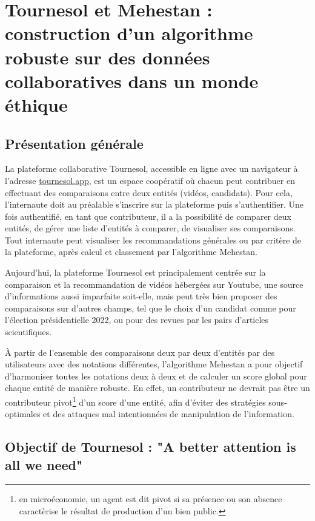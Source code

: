 \section{Tournesol et Mehestan : construction d'un algorithme robuste sur des données collaboratives dans un monde éthique}

\subsection{Présentation générale}

La plateforme collaborative Tournesol, accessible en ligne avec un navigateur à l'adresse
\href{https://tournesol.app}{tournesol.app}, est un espace coopératif où chacun peut contribuer en effectuant des comparaisons entre deux entités (vidéos, candidats). Pour cela, l'internaute doit au préalable s'inscrire sur la plateforme puis s'authentifier. Une fois authentifié, en tant que contributeur, il a la possibilité de comparer deux entités, de gérer une liste d'entités à comparer, de visualiser ses comparaisons. Tout internaute peut visualiser les recommandations générales ou par critère de la plateforme, après calcul et classement par l'algorithme Mehestan.

Aujourd'hui, la plateforme Tournesol est principalement centrée sur la comparaison et la recommandation de vidéos hébergées sur Youtube, une source d'informations aussi imparfaite soit-elle, mais peut très bien proposer des comparaisons sur d'autres champs, tel que le choix d'un candidat comme pour l'élection présidentielle 2022, ou pour des revues par les pairs d'articles scientifiques.

À partir de l'ensemble des comparaisons deux par deux d'entités par des utilisateurs avec des notations différentes, l'algorithme Mehestan a pour objectif d'harmoniser toutes les notations deux à deux et de calculer un score global pour chaque entité de manière robuste. En effet, un contributeur ne devrait pas être un contributeur pivot\footnote{en microéconomie, un agent est dit pivot si sa présence ou son absence caractèrise le résultat de production d'un bien public.} d'un score d'une entité, afin d'éviter des stratégies sous-optimales et des attaques mal intentionnées de manipulation de l'information.

\subsection{Objectif de Tournesol : "A better attention is all we need"}


